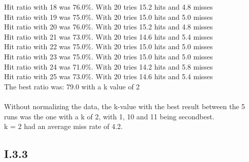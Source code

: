 \documentclass{article}
\begin{document}
Hit ratio with 18 was  {\color{green}76.0\%}. With 20 tries 15.2 hits and 4.8 misses\\
Hit ratio with 19 was  {\color{green}75.0\%}. With 20 tries 15.0 hits and 5.0 misses\\
Hit ratio with 20 was  {\color{green}76.0\%}. With 20 tries 15.2 hits and 4.8 misses\\
Hit ratio with 21 was  {\color{green}73.0\%}. With 20 tries 14.6 hits and 5.4 misses\\
Hit ratio with 22 was  {\color{green}75.0\%}. With 20 tries 15.0 hits and 5.0 misses\\
Hit ratio with 23 was  {\color{green}75.0\%}. With 20 tries 15.0 hits and 5.0 misses\\
Hit ratio with 24 was  {\color{green}71.0\%}. With 20 tries 14.2 hits and 5.8 misses\\
Hit ratio with 25 was  {\color{green}73.0\%}. With 20 tries 14.6 hits and 5.4 misses\\
The best ratio was: 79.0 with a k value of 2\\\\
Without normalizing the data, the k-value with the best result between the 5 runs was the one with a k of 2, with 1, 10 and 11 being secondbest.\\
k = 2 had an average miss rate of 4.2.

\subsection{I.3.3}
\end{document}
